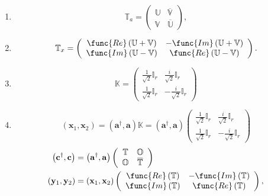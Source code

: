 \documentclass[aps,preprint]{revtex4}
\begin{document}
\begin{enumerate}
\item 
\begin{equation}
\mathbb{T}_{a}=\left( 
\begin{array}{cc}
\mathbb{U} & \overline{\mathbb{V}} \\ 
\mathbb{V} & \overline{\mathbb{U}}%
\end{array}%
\right) ,
\end{equation}

\item 
\begin{equation}
\mathbb{T}_{x}=\left( 
\begin{array}{cc}
\func{Re}\left( \mathbb{U+V}\right) & -\func{Im}\left( \mathbb{U+V}\right)
\\ 
\func{Im}\left( \mathbb{U-V}\right) & \func{Re}\left( \mathbb{U-V}\right)%
\end{array}%
\right) .
\end{equation}

\item 
\begin{equation}
\mathbb{K}=\left( 
\begin{array}{cc}
\frac{1}{\sqrt{2}}\mathbb{I}_{r} & \frac{i}{\sqrt{2}}\mathbb{I}_{r} \\ 
\frac{1}{\sqrt{2}}\mathbb{I}_{r} & -\frac{i}{\sqrt{2}}\mathbb{I}_{r}%
\end{array}%
\right)
\end{equation}

\item 
\begin{equation*}
\left( \mathbf{x}_{1},\mathbf{x}_{2}\right) =\left( \mathbf{a}^{\dagger },%
\mathbf{a}\right) \mathbb{K}=\left( \mathbf{a}^{\dagger },\mathbf{a}\right)
\left( 
\begin{array}{cc}
\frac{1}{\sqrt{2}}\mathbb{I}_{r} & \frac{i}{\sqrt{2}}\mathbb{I}_{r} \\ 
\frac{1}{\sqrt{2}}\mathbb{I}_{r} & -\frac{i}{\sqrt{2}}\mathbb{I}_{r}%
\end{array}%
\right)
\end{equation*}%
\begin{align}
\left( \mathbf{c}^{\dagger },\mathbf{c}\right) & =\left( \mathbf{a}^{\dagger
},\mathbf{a}\right) \left( 
\begin{array}{cc}
\mathbb{T} & \mathbb{O} \\ 
\mathbb{O} & \overline{\mathbb{T}}%
\end{array}%
\right) \\
\left( \mathbf{y}_{1},\mathbf{y}_{2}\right) & =\left( \mathbf{x}_{1},\mathbf{%
x}_{2}\right) \left( 
\begin{array}{cc}
\func{Re}\left( \mathbb{T}\right) & -\func{Im}\left( \mathbb{T}\right) \\ 
\func{Im}\left( \mathbb{T}\right) & \func{Re}\left( \mathbb{T}\right)%
\end{array}%
\right) ,
\end{align}


\end{enumerate}
\end{document}
